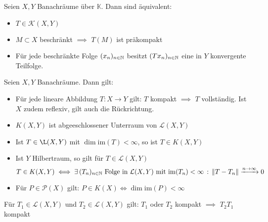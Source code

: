 \documentclass{cheat-sheet}
\newcommand{\K}{\mathbb{K}}
\begin{document}
\begin{lem}
  Seien $X, Y$ Banachräume über $\K$. Dann sind äquivalent:
  \begin{itemize}
    \item $T \in \mathcal{K}(X, Y)$
    \item $M \subset X$ beschränkt $\implies$ $T(M)$ ist präkompakt
    \item Für jede beschränkte Folge $(x_n)_{n \in \mathbb{N}}$ besitzt $(T x_n)_{n \in \mathbb{N}}$ eine in $Y$ konvergente Teilfolge.
  \end{itemize}
\end{lem}


\begin{lem}
  Seien $X, Y$ Banachräume. Dann gilt:
  \begin{itemize}
    \item Für jede lineare Abbildung $T : X \to Y$ gilt: $T$ kompakt $\implies$ $T$ vollständig. Ist $X$ zudem reflexiv, gilt auch die Rückrichtung. %
    \item $K(X, Y)$ ist abgeeschlossener Unterraum von $\mathcal{L}(X, Y)$
    \item Ist $T \in \L(X, Y)$ mit $\dim \mathrm{im}(T) < \infty$, so ist $T \in K(X, Y)$
    \item Ist $Y$ Hilbertraum, so gilt für $T \in \mathcal{L}(X, Y)$
    \[ T \in K(X, Y) \iff \exists \, {(T_n)_{n \in \mathbb{N}} \text{ Folge in } \mathcal{L}(X, Y) \text{ mit } \mathrm{im}(T_n) < \infty} \,:\, \lVert T-T_n\rVert \xrightarrow{n \to \infty} 0 \]
    \item Für $P \in \mathcal{P}(X)$ gilt: $P \in K(X) \iff \dim \mathrm{im}(P) < \infty$
  \end{itemize}
\end{lem}


\begin{lem}
  Für $T_1 \in \mathcal{L}(X, Y)$ und $T_2 \in \mathcal{L}(X, Y)$ gilt:
  $T_1$ oder $T_2$ kompakt $\implies$ $T_2 T_1$ kompakt
\end{lem}

\iffalse
\begin{bspe}
  \begin{itemize}
    \item Sei $\Omega \opn \R^n$, beschränkt mit $\mathcal{C}^{0,1}$-Rand. Seien $m_1 > m_2 \in \N$ und $1 \leq p_1, p_2 < \infty$ sowie $m_1 - \tfrac{n}{p_1} > m_2 - \tfrac{n}{p_2}$. Dann ist die Einbettung $\Id : W^{m_1,p_1}(\Omega) \to W^{m_2,p_2}(\Omega)$ stetig und kompakt.
    \item Viele Integraloperatoren, vgl. z.\,B. ÜA24
  \end{itemize}
\end{bspe}
\fi
\end{document}
